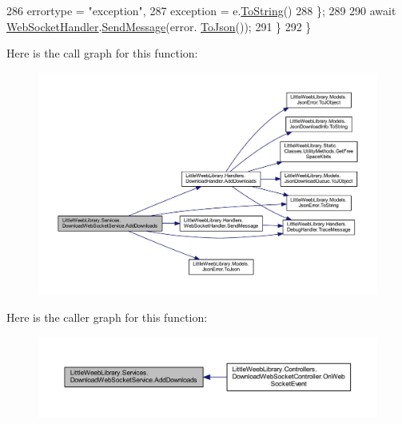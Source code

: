 \begin{DoxyCode}
286                     errortype = \textcolor{stringliteral}{"exception"},
287                     exception = e.\mbox{\hyperlink{class_little_weeb_library_1_1_models_1_1_json_error_ad7d5522c90119111d2e929f39e7f6d3c}{ToString}}()
288                 \};
289 
290                 await \mbox{\hyperlink{class_little_weeb_library_1_1_handlers_1_1_web_socket_handler}{WebSocketHandler}}.\mbox{\hyperlink{class_little_weeb_library_1_1_handlers_1_1_web_socket_handler_a1de289d54d665a32c93478c68d3e6ad0}{SendMessage}}(error.
      \mbox{\hyperlink{class_little_weeb_library_1_1_models_1_1_json_error_a0e3e7dd2e2990404b7f0461742b23440}{ToJson}}());
291             \}
292         \}
\end{DoxyCode}
Here is the call graph for this function\+:\nopagebreak
\begin{figure}[H]
\begin{center}
\leavevmode
\includegraphics[width=350pt]{class_little_weeb_library_1_1_services_1_1_download_web_socket_service_ad6afd5ee42650d16c67790c6d2ac80c1_cgraph}
\end{center}
\end{figure}
Here is the caller graph for this function\+:\nopagebreak
\begin{figure}[H]
\begin{center}
\leavevmode
\includegraphics[width=350pt]{class_little_weeb_library_1_1_services_1_1_download_web_socket_service_ad6afd5ee42650d16c67790c6d2ac80c1_icgraph}
\end{center}
\end{figure}


